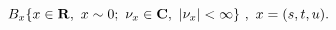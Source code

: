 \begin{equation}
B_x \{ x \in {\bf R},\ x \sim 0;\
    {\nu}_x \in {\bf C},\ |{\nu}_x| < \infty \}\ ,\\\\\
    x = (s,t,u) .
\label{1.13}
\end{equation}

